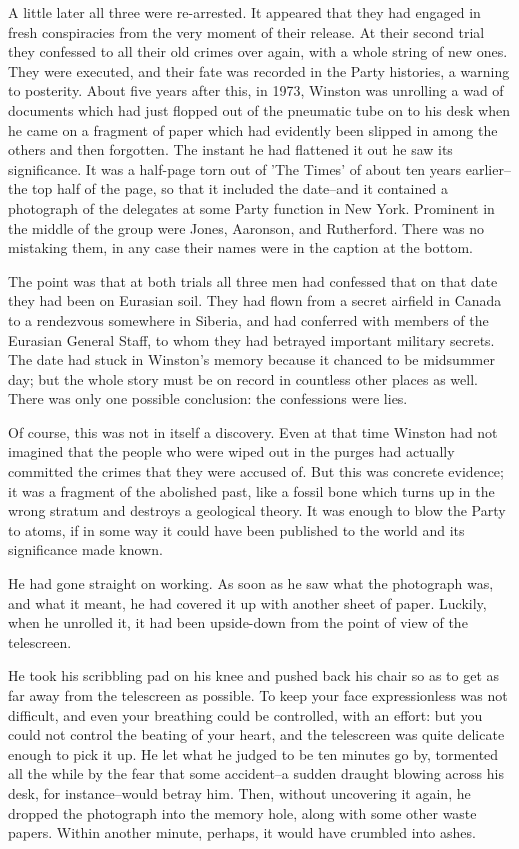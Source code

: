 \documentclass{article}
\begin{document}
A little later all three were re-arrested. It appeared that they had
engaged in fresh conspiracies from the very moment of their release. At
their second trial they confessed to all their old crimes over again, with
a whole string of new ones. They were executed, and their fate was recorded
in the Party histories, a warning to posterity. About five years after
this, in 1973, Winston was unrolling a wad of documents which had just
flopped out of the pneumatic tube on to his desk when he came on a fragment
of paper which had evidently been slipped in among the others and then
forgotten. The instant he had flattened it out he saw its significance.
It was a half-page torn out of 'The Times' of about ten years earlier--the
top half of the page, so that it included the date--and it contained a
photograph of the delegates at some Party function in New York. Prominent
in the middle of the group were Jones, Aaronson, and Rutherford. There was
no mistaking them, in any case their names were in the caption at the
bottom.

The point was that at both trials all three men had confessed that on that
date they had been on Eurasian soil. They had flown from a secret airfield
in Canada to a rendezvous somewhere in Siberia, and had conferred with
members of the Eurasian General Staff, to whom they had betrayed important
military secrets. The date had stuck in Winston's memory because it chanced
to be midsummer day; but the whole story must be on record in countless
other places as well. There was only one possible conclusion: the
confessions were lies.

Of course, this was not in itself a discovery. Even at that time Winston
had not imagined that the people who were wiped out in the purges had
actually committed the crimes that they were accused of. But this was
concrete evidence; it was a fragment of the abolished past, like a fossil
bone which turns up in the wrong stratum and destroys a geological theory.
It was enough to blow the Party to atoms, if in some way it could have
been published to the world and its significance made known.

He had gone straight on working. As soon as he saw what the photograph
was, and what it meant, he had covered it up with another sheet of paper.
Luckily, when he unrolled it, it had been upside-down from the point of
view of the telescreen.

He took his scribbling pad on his knee and pushed back his chair so as
to get as far away from the telescreen as possible. To keep your face
expressionless was not difficult, and even your breathing could be
controlled, with an effort: but you could not control the beating of your
heart, and the telescreen was quite delicate enough to pick it up. He let
what he judged to be ten minutes go by, tormented all the while by the
fear that some accident--a sudden draught blowing across his desk, for
instance--would betray him. Then, without uncovering it again, he dropped
the photograph into the memory hole, along with some other waste papers.
Within another minute, perhaps, it would have crumbled into ashes.
\end{document}
